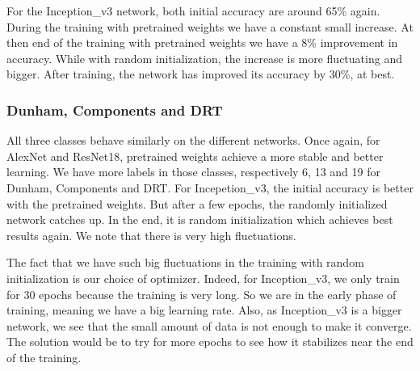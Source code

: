 For the Inception\_v3 network, both initial accuracy are around 65\% again. During the training with pretrained weights we have a constant small increase. At then end of the training with pretrained weights we have a 8\% improvement in accuracy. While with random initialization, the increase is more fluctuating and bigger. After training, the network has improved its accuracy by 30\%, at best.

\subsubsection{Dunham, Components and DRT}
All three classes behave similarly on the different networks. Once again, for AlexNet and ResNet18, pretrained weights achieve a more stable and better learning. We have more labels in those classes, respectively 6, 13 and 19 for Dunham, Components and DRT. 
For Incepetion\_v3, the initial accuracy is better with the pretrained weights. But after a few epochs, the randomly initialized network catches up. In the end, it is random initialization which achieves best results again. We note that there is very high fluctuations. 

The fact that we have such big fluctuations in the training with random initialization is our choice of optimizer. Indeed, for Inception\_v3, we only train for 30 epochs because the training is very long. So we are in the early phase of training, meaning we have a big learning rate. Also, as Inception\_v3 is a bigger network, we see  that the small amount of data is not enough to make it converge. The solution would be to try for more epochs to see how it stabilizes near the end of the training. 

